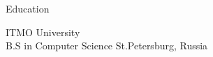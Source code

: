 \documentclass{cv} %
\begin{document}





\begin{rSection}{Education}

ITMO University \hfill {} \\
{\normalfont  B.S in Computer Science \hfill {St.Petersburg, Russia} }


\end{rSection}


\end{document}
